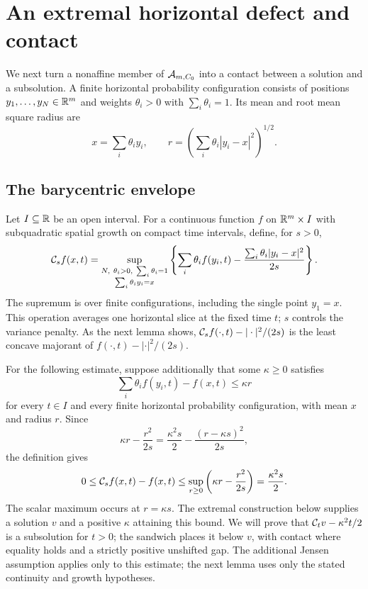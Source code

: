\section{An extremal horizontal defect and contact}\label{sec:envelope-contact}

We next turn a nonaffine member of $\mathcal{A}_{m,C_0}$ into a
contact between a solution and a subsolution. A finite horizontal
probability configuration consists of positions
$y_1,\ldots,y_N\in\mathbb{R}^m$ and weights
$\theta_i>0$ with $\sum_i\theta_i=1$. Its mean and root mean
square radius are
\[
  x=\sum_i\theta_i y_i,\qquad
  r=\left(\sum_i\theta_i|y_i-x|^2\right)^{1/2}.
\]

\subsection{The barycentric envelope}

Let $I\subseteq\mathbb{R}$ be an open interval. For a continuous function $f$ on
$\mathbb{R}^m\times I$ with subquadratic spatial growth on compact time intervals,
define, for $s>0$,
\begin{equation}\label{eq:barycentric-envelope}
  \mathcal{C}_s f(x,t)=
  \sup_{\substack{N,\ \theta_i>0,\ \sum_i\theta_i=1\\
                  \sum_i\theta_i y_i=x}}
   \left\{\sum_i\theta_i f(y_i,t)
             -\frac{\sum_i\theta_i|y_i-x|^2}{2s}\right\}.
\end{equation}
The supremum is over finite configurations, including the
single point $y_1=x$.
This operation averages one horizontal slice at the fixed time $t$;
$s$ controls the variance penalty. As the next lemma shows,
$\mathcal{C}_s f(\cdot,t)-|\cdot|^2/(2s)$ is the least concave majorant of
$f(\cdot,t)-|\cdot|^2/(2s)$.

For the following estimate, suppose additionally that some $\kappa\ge0$
satisfies
\begin{equation}\label{eq:jensen-bound}
  \sum_i\theta_i f(y_i,t)-f(x,t)\le\kappa r
\end{equation}
for every $t\in I$ and every finite horizontal probability
configuration, with mean $x$ and radius $r$. Since
\[
  \kappa r-\frac{r^2}{2s}
   =\frac{\kappa^2s}{2}-\frac{(r-\kappa s)^2}{2s},
\]
the definition gives
\begin{equation}\label{eq:barycentric-sandwich}
  0\le\mathcal{C}_s f(x,t)-f(x,t)
     \le\sup_{r\ge0}\left(\kappa r-\frac{r^2}{2s}\right)
     =\frac{\kappa^2s}{2}.
\end{equation}
The scalar maximum occurs at $r=\kappa s$. The extremal construction
below supplies a solution $v$ and a positive $\kappa$ attaining this bound.
We will prove that $\mathcal{C}_t v-\kappa^2t/2$ is a subsolution for $t>0$;
the sandwich places it below $v$, with contact where equality holds and
a strictly positive unshifted gap.
The additional Jensen assumption applies only to this estimate; the next
lemma uses only the stated continuity and growth hypotheses.

